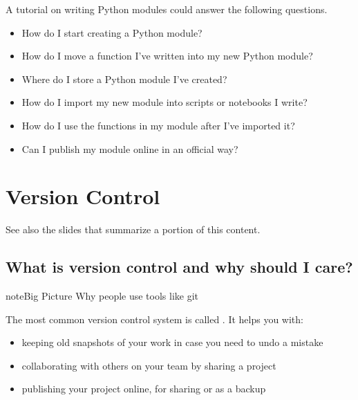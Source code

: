 \documentclass[letterpaper,10pt,english]{sphinxmanual}
\begin{document}
A tutorial on writing Python modules could answer the following questions.
\begin{itemize}
\item {} 
How do I start creating a Python module?

\item {} 
How do I move a function I’ve written into my new Python module?

\item {} 
Where do I store a Python module I’ve created?

\item {} 
How do I import my new module into scripts or notebooks I write?

\item {} 
How do I use the functions in my module after I’ve imported it?

\item {} 
Can I publish my module online in an official way?

\end{itemize}


\chapter{Version Control}
\label{\detokenize{chapter-8-version-control:version-control}}\label{\detokenize{chapter-8-version-control::doc}}
See also the slides that summarize a portion of this content.


\section{What is version control and why should I care?}
\label{\detokenize{chapter-8-version-control:what-is-version-control-and-why-should-i-care}}
\begin{sphinxadmonition}{note}{Big Picture \sphinxhyphen{} Why people use tools like git}

The most common version control system is called .  It helps you with:
\begin{itemize}
\item {} 
keeping old snapshots of your work in case you need to undo a mistake

\item {} 
collaborating with others on your team by sharing a project

\item {} 
publishing your project online, for sharing or as a backup

\end{itemize}
\end{sphinxadmonition}
\end{document}
